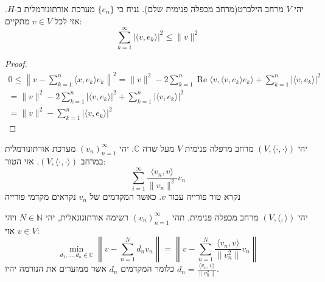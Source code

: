 \documentclass{tstextbook}
\begin{document}
\begin{proposition}
יהי \(V\) מרחב הילברט(מרחב מכפלה פנימית שלם). נניח כי \(\{ e_{n} \}\) מערכת אורתונורמלית ב-\(H\). אזי לכל \(v \in V\) מתקיים:
$$\sum_{k=1}^{\infty}|\langle v,e_{k}\rangle|^{2}\leq\|v\|^{2}$$

\end{proposition}
\begin{proof}
\begin{gather*}{0\leq\left\lVert v-\sum_{k=1}^{n}\langle x,e_{k}\rangle e_{k}\right\rVert ^{2}=\|v\|^{2}-2\sum_{k=1}^{n}\operatorname{Re}\langle v,\langle v,e_{k}\rangle e_{k}\rangle+\sum_{k=1}^{n}|\langle v,e_{k}\rangle|^{2}}\\ {=\|v\|^{2}-2\sum_{k=1}^{n}|\langle v,e_{k}\rangle|^{2}+\sum_{k=1}^{n}|\langle v,e_{k}\rangle|^{2}}\\ {=\|v\|^{2}-\sum_{k=1}^{n}|\langle v,e_{k}\rangle|^{2}}\end{gather*}

\end{proof}
\begin{definition}
יהי \((V,\langle \cdot,\cdot \rangle)\) מרחב מרפלה פנימית \(V\) מעל שדה \(\mathbb{C}\). יהי \((v_{n})^{\infty}_{n=1}\) מערכת אורתונורמלית במרחב \((V,\langle \cdot,\cdot \rangle)\). אזי הטור:
$$\sum_{i=1}^{\infty} \frac{\langle v_{n},v \rangle}{\lVert v_{n} \rVert ^{2}}v_{n} $$
נקרא טור פורייה עבור \(v\). כאשר המקדמים של \(v_{n}\) נקראים מקדמי פורייה

\end{definition}
\begin{proposition}
יהי \((V,\langle , \rangle)\) מרחב מכפלה פנימית. תהי \((v_{n})_{n=1}^{\infty}\) רשימה אורתוגונאלית, יהי \(N \in \mathbb{N}\) ויהי \(v \in V\) אזי:
$$\min _{d_{1},\dots,d_{n}\in \mathbb{C}}\left\lVert  v-\sum_{n=1}^{N} d_{n}v_{n}  \right\rVert = \left\lVert  v-\sum_{n=1}^{N} \frac{\langle v_{n},v \rangle}{\lVert v_{n}^{2} \rVert }v_{n}   \right\rVert $$
כלומר המקדמים \(d_{n}\) אשר ממזערים את הנורמה יהיו \(d_{n}=\frac{\langle v_{n},v \rangle}{\lVert v_{n}^{2} \rVert}\).

\end{proposition}
\end{document}
